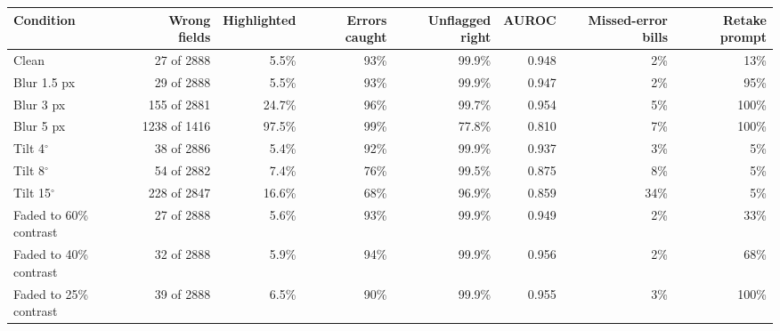 \begin{tabular}{@{}lrrrrrrr@{}}
\toprule
Condition & Wrong fields & Highlighted & Errors caught & Unflagged right & AUROC & Missed-error bills & Retake prompt \\
\midrule
Clean & 27 of 2888 & 5.5\% & 93\% & 99.9\% & 0.948 & 2\% & 13\% \\
Blur 1.5 px & 29 of 2888 & 5.5\% & 93\% & 99.9\% & 0.947 & 2\% & 95\% \\
Blur 3 px & 155 of 2881 & 24.7\% & 96\% & 99.7\% & 0.954 & 5\% & 100\% \\
Blur 5 px & 1238 of 1416 & 97.5\% & 99\% & 77.8\% & 0.810 & 7\% & 100\% \\
Tilt 4$^\circ$ & 38 of 2886 & 5.4\% & 92\% & 99.9\% & 0.937 & 3\% & 5\% \\
Tilt 8$^\circ$ & 54 of 2882 & 7.4\% & 76\% & 99.5\% & 0.875 & 8\% & 5\% \\
Tilt 15$^\circ$ & 228 of 2847 & 16.6\% & 68\% & 96.9\% & 0.859 & 34\% & 5\% \\
Faded to 60\% contrast & 27 of 2888 & 5.6\% & 93\% & 99.9\% & 0.949 & 2\% & 33\% \\
Faded to 40\% contrast & 32 of 2888 & 5.9\% & 94\% & 99.9\% & 0.956 & 2\% & 68\% \\
Faded to 25\% contrast & 39 of 2888 & 6.5\% & 90\% & 99.9\% & 0.955 & 3\% & 100\% \\
\bottomrule
\end{tabular}
